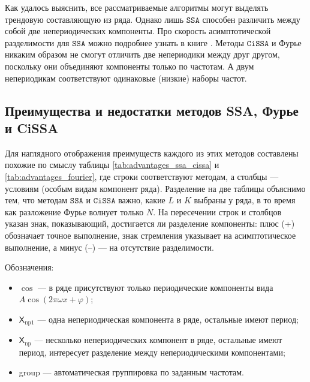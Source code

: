 \documentclass[12pt, specialist, subf
]{disser}
\theoremstyle{definition}
\newcommand{\SSA}{\texttt{SSA}}
\newcommand{\CISSA}{\texttt{CiSSA}}
\newcommand{\TS}{\mathsf{X}}
\begin{document}
Как удалось выяснить, все рассматриваемые алгоритмы могут выделять трендовую составляющую из ряда. Однако лишь $\SSA$ способен различить между собой две непериодических компоненты. Про скорость асимптотической разделимости для $\SSA$ можно подробнее узнать в книге \cite{golyandina2001analysis}. Методы $\CISSA$ и Фурье никаким образом не смогут отличить две непериодики между друг другом, поскольку они объединяют компоненты только по частотам. А двум непериодикам соответствуют одинаковые (низкие) наборы частот.


\subsection{Преимущества и недостатки методов SSA, Фурье и CiSSA}

Для наглядного отображения преимуществ каждого из этих методов составлены похожие по смыслу таблицы \ref{tab:advantages_ssa_cissa} и \ref{tab:advantages_fourier}, где строки соответствуют методам, а столбцы --- условиям (особым видам компонент ряда). Разделение на две таблицы объяснимо тем, что методам $\SSA$ и $\CISSA$ важно, какие $L$ и  $K$ выбраны у ряда, в то время как разложение Фурье волнует только $N$. На пересечении строк и столбцов указан знак, показывающий, достигается ли разделение компоненты: плюс (+) обозначает точное выполнение, знак стремления указывает на асимптотическое выполнение, а минус (–) --- на отсутствие разделимости.

Обозначения:
\begin{itemize}
	\item $\cos$ --- в ряде присутствуют только периодические компоненты вида $A\cos(2\pi \omega x + \varphi)$;
	\item $\TS_{\mathrm{np}1}$ --- одна непериодическая компонента в ряде, остальные имеют период;
	\item $\TS_{\mathrm{np}}$ --- несколько непериодических компонент в ряде, остальные имеют период, интересует разделение между
	      непериодическими компонентами;
	\item group --- автоматическая группировка по заданным частотам.
\end{itemize}
\end{document}
